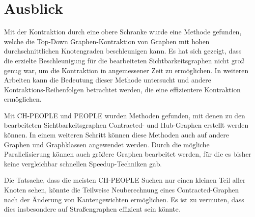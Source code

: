 \chapter{Ausblick}

Mit der Kontraktion durch eine obere Schranke wurde eine Methode gefunden, welche die Top-Down Graphen-Kontraktion von Graphen mit hohen durchschnittlichen Knotengraden beschleunigen kann.
Es hat sich gezeigt, dass die erzielte Beschleunigung für die bearbeiteten Sichtbarkeitsgraphen nicht groß genug war, um die Kontraktion in angemessener Zeit zu ermöglichen.
In weiteren Arbeiten kann die Bedeutung dieser Methode untersucht und andere Kontraktions-Reihenfolgen betrachtet werden, die eine effizientere Kontraktion ermöglichen.

Mit CH-PEOPLE und PEOPLE wurden Methoden gefunden, mit denen zu den bearbeiteten Sichtbarkeitsgraphen Contracted- und Hub-Graphen erstellt werden können.
In einem weiteren Schritt können diese Methoden auch auf andere Graphen und Graphklassen angewendet werden.
Durch die mögliche Parallelisierung können auch größere Graphen bearbeitet werden, für die es bisher keine vergleichbar schnellen Speedup-Techniken gab.

Die Tatsache, dass die meisten CH-PEOPLE Suchen nur einen kleinen Teil aller Knoten sehen, könnte die Teilweise Neuberechnung eines Contracted-Graphen nach der Änderung von Kantengewichten ermöglichen.
Es ist zu vermuten, dass dies insbesondere auf Straßengraphen effizient sein könnte.